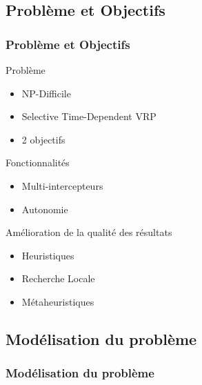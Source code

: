 \subsection{Problème et Objectifs}
\begin{frame}
	\frametitle{Problème et Objectifs}
	\begin{exampleblock}{Problème}
		\begin{itemize}
			\item NP-Difficile
			\item Selective Time-Dependent VRP
			\item 2 objectifs
		\end{itemize}
	\end{exampleblock}
	\begin{block}{Fonctionnalités}
		\begin{itemize}
			\item Multi-intercepteurs
			\item Autonomie
		\end{itemize}
	\end{block}
	\begin{block}{Amélioration de la qualité des résultats}
		\begin{itemize}
			\item Heuristiques
			\item Recherche Locale
			\item Métaheuristiques
		\end{itemize}
	\end{block}
\end{frame}

\subsection{Modélisation du problème}
\begin{frame}
	\frametitle{Modélisation du problème}
	\begin{center}
		
	\end{center}
\end{frame}

